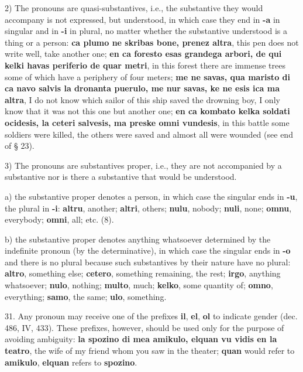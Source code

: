 2) The pronouns are quasi-substantives, i.e., the substantive they would accompany is not expressed, but understood, in which case they end in \textbf{-a} in singular and in \textbf{-i} in plural, no matter whether the substantive understood is a thing or a person: \textbf{ca plumo ne skribas bone, prenez altra}, this pen does not write well, take another one; \textbf{en ca foresto esas grandega arbori, de qui kelki havas periferio de quar metri}, in this forest there are immense trees some of which have a periphery of four meters; \textbf{me ne savas, qua maristo di ca navo salvis la dronanta puerulo, me nur savas, ke ne esis ica ma altra}, I do not know which sailor of this ship saved the drowning boy, I only know that it was not this one but another one; \textbf{en ca kombato kelka soldati ocidesis, la ceteri salvesis, ma preske omni vundesis}, in this battle some soldiers were killed, the others were saved and almost all were wounded (see end of § 23). 

3) The pronouns are substantives proper, i.e., they are not accompanied by a substantive nor is there a substantive that would be understood. 

a) the substantive proper denotes a person, in which case the singular ends in \textbf{-u}, the plural in \textbf{-i}: \textbf{altru}, another; \textbf{altri}, others; \textbf{nulu}, nobody; \textbf{nuli}, none; \textbf{omnu}, everybody; \textbf{omni}, all; etc. (8). 

b) the substantive proper denotes anything whatsoever determined by the indefinite pronoun (by the determinative), in which case the singular ends in \textbf{-o} and there is no plural because such substantives by their nature have no plural: \textbf{altro}, something else; \textbf{cetero}, something remaining, the rest; \textbf{irgo}, anything whatsoever; \textbf{nulo}, nothing; \textbf{multo}, much; \textbf{kelko}, some quantity of; \textbf{omno}, everything; \textbf{samo}, the same; \textbf{ulo}, something. 

31. Any pronoun may receive one of the prefixes \textbf{il}, \textbf{el}, \textbf{ol} to indicate gender (dec. 486, IV, 433). These prefixes, however, should be used only for the purpose of avoiding ambiguity: \textbf{la spozino di mea amikulo, elquan vu vidis en la teatro}, the wife of my friend whom you saw in the theater; \textbf{quan} would refer to \textbf{amikulo}, \textbf{elquan} refers to \textbf{spozino}.

